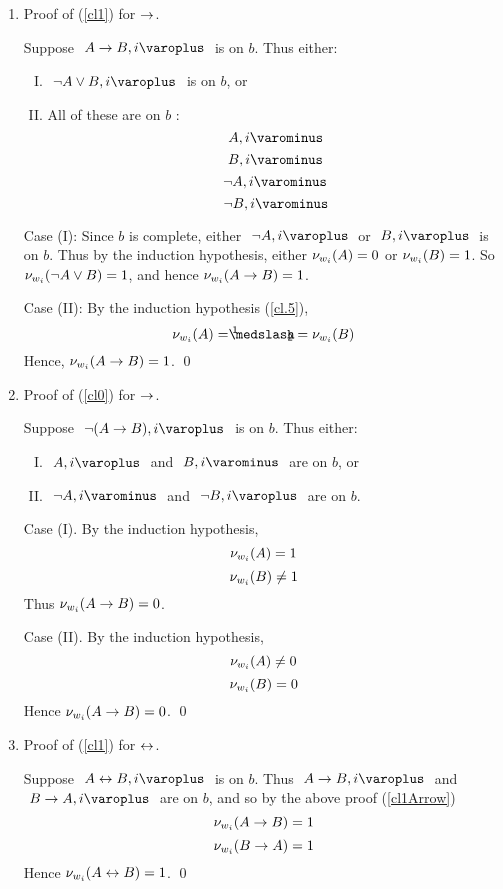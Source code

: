 \begin{proof*}
\begin{enumerate}
\pagebreak
		
	\item\label{cl1Arrow} Proof of (\ref{cl1}) for $ \rightarrow $.
		
			Suppose $ \like{ \dNodei{ A \arrow B } } $ is on $ b $. Thus either:
			\begin{enumerate}[(I)]
				\item $ \like{ \dNodei{ \neg A \vee B } } $ is on $ b $, or
				\item All of these are on $b$ : 
						\[ \like{ \uNodei{ A } } \]
						\[ \like{ \uNodei{ B } } \]
						\[ \like{ \uNodei{ \neg A } } \]
						\[ \like{ \uNodei{ \neg B } } \]
			\end{enumerate}
			
			Case (I): Since $b$ is complete, either $ \like{ \dNodei{ \neg A }} $ or $ \like{ \dNodei{ B }} $ is on $b$.
			Thus by the induction hypothesis, either $ \mathcal{\nu}_{ w_i }({ A }) = 0 $ or $ \mathcal{\nu}_{ w_i }({ B }) = 1 $. 
			So $\mathcal{\nu}_{ w_i }({ \neg A \vee B }) = 1 $, and hence $ \mathcal{\nu}_{ w_i }({ A \rightarrow B }) = 1 $.
		
			Case (II): By the induction hypothesis (\ref{cl.5}),
			\[ \Valwi{ A } = \oneHalf = \Valwi{ B } \]
			Hence, $ \mathcal{\nu}_{ w_i }({ A \rightarrow B }) = 1 $.
			\qed
			 
	\item\label{cl0Arrow} Proof of (\ref{cl0}) for $ \rightarrow $.
		
			Suppose $ \like{ \dNodei{ \neg (A \arrow B) } } $ is on $b$.
			Thus either:
			\begin{enumerate}[(I)]
				\item $ \like{ \dNodei{ A }} $ and $ \like{ \uNodei{ B }}$ are on $b$, or
				\item $ \like{ \uNodei{ \neg A }} $ and $ \like{ \dNodei{ \neg B }} $ are on $b$.
			\end{enumerate}

			Case (I). By the induction hypothesis, 
			\[ \mathcal{\nu}_{ w_i }({ A }) = 1 \]
			\[ \mathcal{\nu}_{ w_i }({ B }) \neq 1 \]
			Thus $ \mathcal{\nu}_{ w_i }({ A \rightarrow B }) = 0 $.
		
			Case (II). By the induction hypothesis,
			\[ \mathcal{\nu}_{ w_i }({ A }) \neq 0 \]
			\[ \mathcal{\nu}_{ w_i }({ B }) = 0 \]
			Hence $ \mathcal{\nu}_{ w_i }({ A \rightarrow B }) = 0 $.
			\qed


	\item Proof of (\ref{cl1}) for $ \leftrightarrow $.
	
			Suppose $ \like{ \dNodei{ A \biarrow B } } $ is on $ b $.
			Thus $ \like{ \dNodei{ A \arrow B } } $ and $ \like{ \dNodei{ B \arrow A }} $ are on $ b $, and so by the above proof (\ref{cl1Arrow})
			\[ \mathcal{\nu}_{ w_i }({ A \rightarrow B }) = 1 \]
			\[ \mathcal{\nu}_{ w_i }({ B \rightarrow A }) = 1 \]
			Hence $ \mathcal{\nu}_{ w_i }({ A \leftrightarrow B }) = 1 $.
			\qed
		

\end{enumerate}
\end{proof*}
